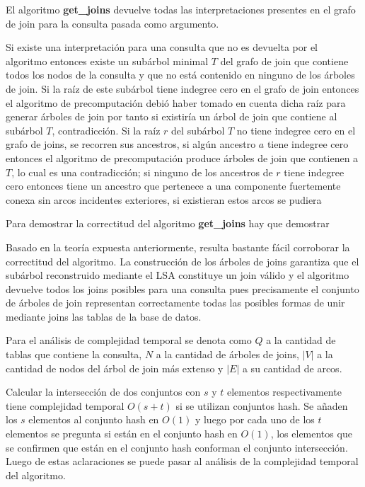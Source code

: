\begin{theorem}
    El algoritmo \textbf{get\_joins} devuelve todas las interpretaciones presentes en el grafo de join 
    para la consulta pasada como argumento.
\end{theorem}

Si existe una interpretaci\'on para una consulta que no es devuelta por el algoritmo entonces 
existe un sub\'arbol minimal $T$ del grafo de join que contiene todos los nodos de la consulta y que no est\'a contenido 
en ninguno de los \'arboles de join. Si la raíz de este sub\'arbol tiene indegree cero en el grafo de join entonces 
el algoritmo de precomputaci\'on debi\'o haber tomado en cuenta dicha ra\'iz para generar \'arboles de join 
por tanto si existir\'ia un \'arbol de join que contiene al sub\'arbol $T$, contradicción. Si la ra\'iz $r$ del 
sub\'arbol $T$ no tiene indegree cero en el grafo de joins, se recorren sus ancestros, si algún ancestro $a$ tiene 
indegree cero entonces el algoritmo de precomputaci\'on produce \'arboles de join que contienen a $T$, lo 
cual es una contradicción; si ninguno de los ancestros de $r$ tiene indegree cero entonces tiene un ancestro 
que pertenece a una componente fuertemente conexa sin arcos incidentes exteriores, si existieran estos arcos 
se pudiera 


Para demostrar la correctitud del algoritmo \textbf{get\_joins} hay que demostrar 

Basado en la teoría expuesta anteriormente, resulta bastante fácil corroborar la correctitud del 
algoritmo. La construcción de los \'arboles de joins garantiza que el sub\'arbol reconstruido mediante el 
LSA constituye un join válido y el algoritmo devuelve todos los joins posibles para una consulta pues 
precisamente el conjunto de \'arboles de join representan correctamente todas las posibles formas de 
unir mediante joins las tablas de la base de datos.

Para el análisis de complejidad temporal se denota como $Q$ a la cantidad de tablas que contiene la consulta, 
$N$ a la cantidad de \'arboles de joins, $|V|$ a la cantidad de nodos del \'arbol de join m\'as extenso y $|E|$
a su cantidad de arcos. 

Calcular la intersección de dos conjuntos con $s$ y $t$ elementos respectivamente tiene 
complejidad temporal $O(s + t)$ si se utilizan conjuntos hash. Se añaden los $s$ elementos al conjunto hash en $O(1)$
y luego por cada uno de los $t$ elementos se pregunta si est\'an en el conjunto hash en $O(1)$, los elementos 
que se confirmen que est\'an en el conjunto hash conforman el conjunto intersección. Luego de estas aclaraciones 
se puede pasar al análisis de la complejidad temporal del algoritmo.

